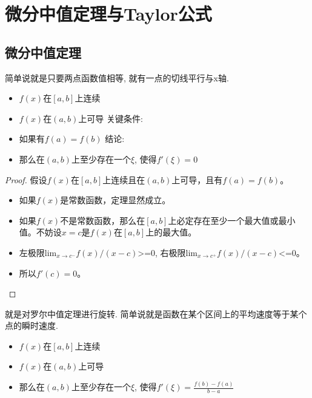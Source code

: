 \chapter{微分中值定理与Taylor公式}

\section{微分中值定理}

\begin{theorem}[罗尔中值定理]
    简单说就是只要两点函数值相等, 就有一点的切线平行与x轴.
    \begin{itemize}
        前提条件: 
        \item $f(x)$在$[a, b]$上连续
        \item $f(x)$在$(a, b)$上可导
        关键条件: 
        \item 如果有$f(a) = f(b)$
        结论:
        \item 那么在$(a, b)$上至少存在一个$\xi$, 使得$f'(\xi) = 0$
    \end{itemize}
\end{theorem}

\begin{proof}
    假设$f(x)$在$[a, b]$上连续且在$(a, b)$上可导，且有$f(a) = f(b)$。
    \begin{itemize}
        \item 如果$f(x)$是常数函数，定理显然成立。
        \item 如果$f(x)$不是常数函数，那么在$[a, b]$上必定存在至少一个最大值或最小值。不妨设$x = c$是$f(x)$在$[a, b]$上的最大值。
        \item 左极限lim$_{x \to c^-} f(x) / (x-c) $>=0, 右极限lim$_{x \to c^+} f(x) / (x-c) $<=0。
        \item 所以$f'(c) = 0$。
    \end{itemize}
\end{proof}

\begin{theorem}[拉格朗日中值定理]
    就是对罗尔中值定理进行旋转. 
    简单说就是函数在某个区间上的平均速度等于某个点的瞬时速度.
    \begin{itemize}
        \item $f(x)$在$[a, b]$上连续
        \item $f(x)$在$(a, b)$上可导
        \item 那么在$(a, b)$上至少存在一个$\xi$, 使得$f'(\xi) = \frac{f(b) - f(a)}{b - a}$
    \end{itemize}
\end{theorem}

